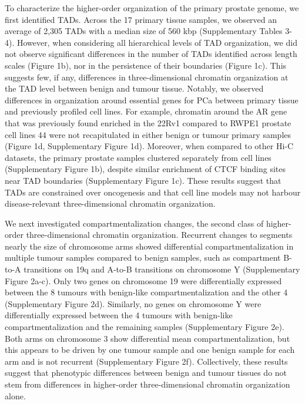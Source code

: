 To characterize the higher-order organization of the primary prostate genome, we first identified TADs.
Across the 17 primary tissue samples, we observed an average of 2,305 TADs with a median size of 560 kbp (Supplementary Tables 3-4).
However, when considering all hierarchical levels of TAD organization, we did not observe significant differences in the number of TADs identified across length scales (Figure 1b), nor in the persistence of their boundaries (Figure 1c).
This suggests few, if any, differences in three-dimensional chromatin organization at the TAD level between benign and tumour tissue.
Notably, we observed differences in organization around essential genes for PCa between primary tissue and previously profiled cell lines.
For example, chromatin around the AR gene that was previously found enriched in the 22Rv1 compared to RWPE1 prostate cell lines 44 were not recapitulated in either benign or tumour primary samples (Figure 1d, Supplementary Figure 1d).
Moreover, when compared to other Hi-C datasets, the primary prostate samples clustered separately from cell lines (Supplementary Figure 1b), despite similar enrichment of CTCF binding sites near TAD boundaries (Supplementary Figure 1c).
These results suggest that TADs are constrained over oncogenesis and that cell line models may not harbour disease-relevant three-dimensional chromatin organization.

We next investigated compartmentalization changes, the second class of higher-order three-dimensional chromatin organization.
Recurrent changes to segments nearly the size of chromosome arms showed differential compartmentalization in multiple tumour samples compared to benign samples, such as compartment B-to-A transitions on 19q and A-to-B transitions on chromosome Y (Supplementary Figure 2a-c).
Only two genes on chromosome 19 were differentially expressed between the 8 tumours with benign-like compartmentalization and the other 4 (Supplementary Figure 2d).
Similarly, no genes on chromosome Y were differentially expressed between the 4 tumours with benign-like compartmentalization and the remaining samples (Supplementary Figure 2e).
Both arms on chromosome 3 show differential mean compartmentalization, but this appears to be driven by one tumour sample and one benign sample for each arm and is not recurrent (Supplementary Figure 2f).
Collectively, these results suggest that phenotypic differences between benign and tumour tissues do not stem from differences in higher-order three-dimensional chromatin organization alone.

